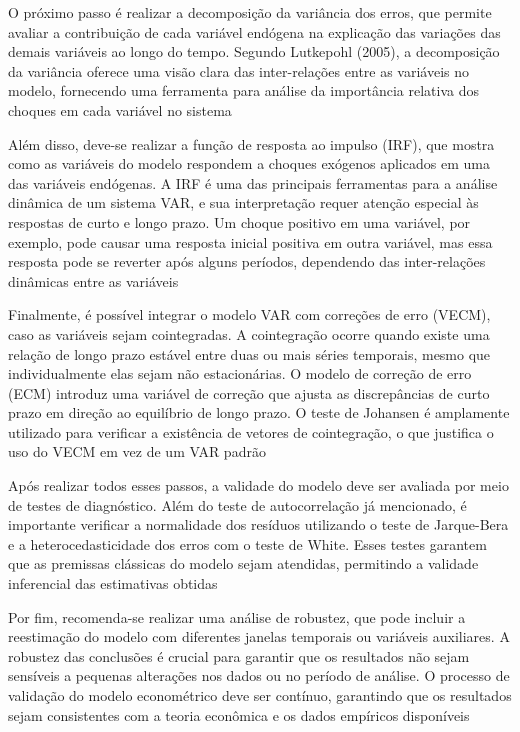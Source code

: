 \documentclass[12pt,oneside,a4paper,chapter=TITLE,english,brazil,sumario=abnt-6027-2012]{abntex2}
\begin{document}
O próximo passo é realizar a decomposição da variância dos erros, que permite avaliar a contribuição de cada variável endógena na explicação das variações das demais variáveis ao longo do tempo. Segundo Lutkepohl (2005), a decomposição da variância oferece uma visão clara das inter-relações entre as variáveis no modelo, fornecendo uma ferramenta para análise da importância relativa dos choques em cada variável no sistema %

Além disso, deve-se realizar a função de resposta ao impulso (IRF), que mostra como as variáveis do modelo respondem a choques exógenos aplicados em uma das variáveis endógenas. A IRF é uma das principais ferramentas para a análise dinâmica de um sistema VAR, e sua interpretação requer atenção especial às respostas de curto e longo prazo. Um choque positivo em uma variável, por exemplo, pode causar uma resposta inicial positiva em outra variável, mas essa resposta pode se reverter após alguns períodos, dependendo das inter-relações dinâmicas entre as variáveis %

Finalmente, é possível integrar o modelo VAR com correções de erro (VECM), caso as variáveis sejam cointegradas. A cointegração ocorre quando existe uma relação de longo prazo estável entre duas ou mais séries temporais, mesmo que individualmente elas sejam não estacionárias. O modelo de correção de erro (ECM) introduz uma variável de correção que ajusta as discrepâncias de curto prazo em direção ao equilíbrio de longo prazo. O teste de Johansen é amplamente utilizado para verificar a existência de vetores de cointegração, o que justifica o uso do VECM em vez de um VAR padrão %

Após realizar todos esses passos, a validade do modelo deve ser avaliada por meio de testes de diagnóstico. Além do teste de autocorrelação já mencionado, é importante verificar a normalidade dos resíduos utilizando o teste de Jarque-Bera e a heterocedasticidade dos erros com o teste de White. Esses testes garantem que as premissas clássicas do modelo sejam atendidas, permitindo a validade inferencial das estimativas obtidas %

Por fim, recomenda-se realizar uma análise de robustez, que pode incluir a reestimação do modelo com diferentes janelas temporais ou variáveis auxiliares. A robustez das conclusões é crucial para garantir que os resultados não sejam sensíveis a pequenas alterações nos dados ou no período de análise. O processo de validação do modelo econométrico deve ser contínuo, garantindo que os resultados sejam consistentes com a teoria econômica e os dados empíricos disponíveis %
\end{document}
